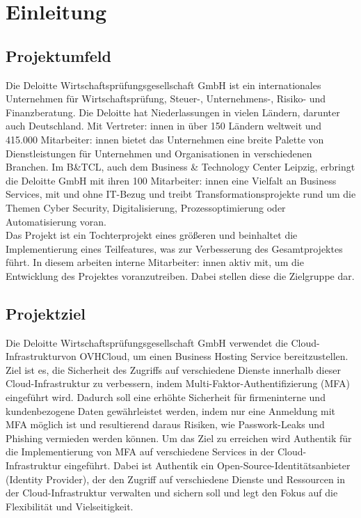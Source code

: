
\section{Einleitung}
\label{sec:Einleitung}


\subsection{Projektumfeld} 
\label{sec:Projektumfeld}
Die Deloitte Wirtschaftsprüfungsgesellschaft GmbH ist ein internationales 
Unternehmen für Wirtschaftsprüfung, Steuer-, Unternehmens-, Risiko- und Finanzberatung.
Die Deloitte hat Niederlassungen in vielen Ländern, darunter auch Deutschland. 
Mit Vertreter: innen in über 150 Ländern weltweit und 415.000 Mitarbeiter: innen bietet das Unternehmen eine breite Palette 
von Dienstleistungen für Unternehmen und Organisationen in verschiedenen Branchen.
Im B\&TCL, auch dem Business \& Technology Center Leipzig, erbringt die Deloitte
GmbH mit ihren 100 Mitarbeiter: innen eine Vielfalt an Business Services, mit und ohne IT-Bezug und treibt
Transformationsprojekte rund um die Themen Cyber Security, Digitalisierung,
Prozessoptimierung oder Automatisierung voran.
\\Das Projekt ist ein Tochterprojekt eines größeren und beinhaltet die Implementierung eines Teilfeatures, was zur 
Verbesserung des Gesamtprojektes führt. In diesem arbeiten interne Mitarbeiter: innen aktiv mit, um die Entwicklung des
Projektes voranzutreiben. Dabei stellen diese die Zielgruppe dar.


\subsection{Projektziel} 
\label{sec:Projektziel}
Die Deloitte Wirtschaftsprüfungsgesellschaft GmbH verwendet die Cloud-Infrastrukturvon OVHCloud, um einen Business 
Hosting Service bereitzustellen. 
\\Ziel ist es, die Sicherheit des Zugriffs auf verschiedene Dienste innerhalb dieser Cloud-Infrastruktur zu verbessern, indem 
Multi-Faktor-Authentifizierung (MFA) eingeführt wird. Dadurch soll eine erhöhte Sicherheit für firmeninterne und kundenbezogene 
Daten gewährleistet werden, indem nur eine Anmeldung mit MFA möglich ist und resultierend daraus Risiken, wie Passwork-Leaks 
und Phishing vermieden werden können.
Um das Ziel zu erreichen wird Authentik für die Implementierung von MFA auf verschiedene Services in der 
Cloud-Infrastruktur eingeführt. 
Dabei ist Authentik ein Open-Source-Identitätsanbieter (Identity Provider), der den Zugriff auf verschiedene Dienste und 
Ressourcen in der Cloud-Infrastruktur verwalten und sichern soll und legt den Fokus auf die Flexibilität und Vielseitigkeit. 


